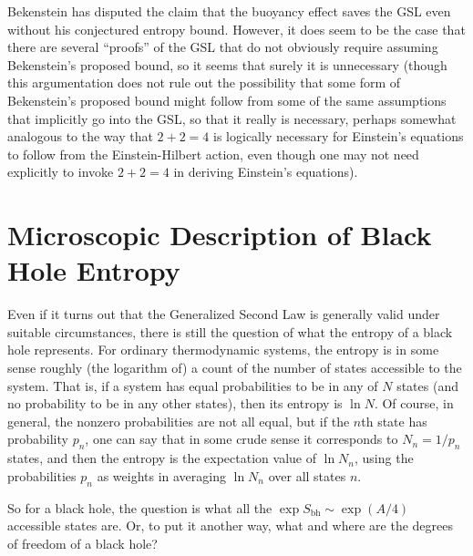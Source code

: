 \documentclass[12pt]{article} \usepackage{latexsym} \textwidth 15cm
\begin{document}
Bekenstein \cite{Bek6,Bek7,Bek8} has disputed the claim that the
buoyancy effect saves the GSL even without his conjectured entropy
bound.  However, it does seem to be the case that there are several
``proofs'' of the GSL that do not obviously require assuming
Bekenstein's proposed bound, so it seems that surely it is unnecessary
(though this argumentation does not rule out the possibility that some
form of Bekenstein's proposed bound might follow from some of the same
assumptions that implicitly go into the GSL, so that it really is
necessary, perhaps somewhat analogous to the way that $2+2=4$ is
logically necessary for Einstein's equations to follow from the
Einstein-Hilbert action, even though one may not need explicitly to
invoke $2+2=4$ in deriving Einstein's equations).

\section{Microscopic Description of Black Hole Entropy}

Even if it turns out that the Generalized Second Law is generally
valid under suitable circumstances, there is still the question of
what the entropy of a black hole represents.  For ordinary
thermodynamic systems, the entropy is in some sense roughly (the
logarithm of) a count of the number of states accessible to the
system.  That is, if a system has equal probabilities to be in any of
$N$ states (and no probability to be in any other states), then its
entropy is $\ln{N}$.  Of course, in general, the nonzero probabilities
are not all equal, but if the $n$th state has probability $p_n$, one
can say that in some crude sense it corresponds to $N_n = 1/p_n$
states, and then the entropy is the expectation value of $\ln{N_n}$,
using the probabilities $p_n$ as weights in averaging $\ln{N_n}$ over
all states $n$.

So for a black hole, the question is what all the
$\exp{S_{\mathrm{bh}}} \sim \exp{(A/4)}$ accessible states are.  Or,
to put it another way, what and where are the degrees of freedom of a
black hole?
\end{document}
